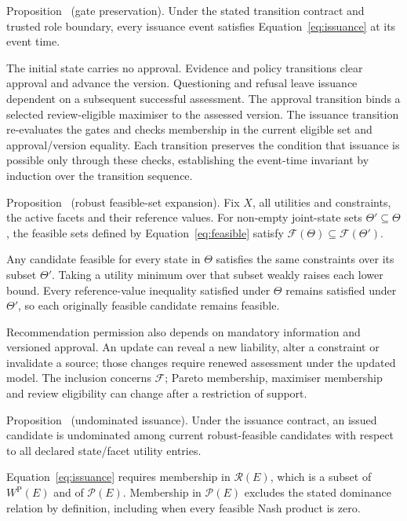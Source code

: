 \documentclass[oneside,10pt,english]{swissi}
\begin{document}
\begin{samepage}
\label{prop:gate}
Proposition~\thetheorem{} (gate preservation). Under the stated transition contract and trusted role boundary, every issuance event satisfies Equation~\eqref{eq:issuance} at its event time.

\nopagebreak[4]
The initial state carries no approval. Evidence and policy transitions clear approval and advance the version. Questioning and refusal leave issuance dependent on a subsequent successful assessment. The approval transition binds a selected review-eligible maximiser to the assessed version. The issuance transition re-evaluates the gates and checks membership in the current eligible set and approval/version equality. Each transition preserves the condition that issuance is possible only through these checks, establishing the event-time invariant by induction over the transition sequence.
\par
\end{samepage}

\begin{samepage}
\label{prop:expansion}
Proposition~\thetheorem{} (robust feasible-set expansion). Fix $X$, all utilities and constraints, the active facets and their reference values. For non-empty joint-state sets $\Theta'\subseteq\Theta$, the feasible sets defined by Equation~\eqref{eq:feasible} satisfy $\mathcal F(\Theta)\subseteq\mathcal F(\Theta')$.

\nopagebreak[4]
Any candidate feasible for every state in $\Theta$ satisfies the same constraints over its subset $\Theta'$. Taking a utility minimum over that subset weakly raises each lower bound. Every reference-value inequality satisfied under $\Theta$ remains satisfied under $\Theta'$, so each originally feasible candidate remains feasible.
\par
\end{samepage}

Recommendation permission also depends on mandatory information and versioned approval. An update can reveal a new liability, alter a constraint or invalidate a source; those changes require renewed assessment under the updated model. The inclusion concerns $\mathcal F$; Pareto membership, maximiser membership and review eligibility can change after a restriction of support.

\begin{samepage}
\label{prop:undominated}
Proposition~\thetheorem{} (undominated issuance). Under the issuance contract, an issued candidate is undominated among current robust-feasible candidates with respect to all declared state/facet utility entries.

\nopagebreak[4]
Equation~\eqref{eq:issuance} requires membership in $\mathcal R(E)$, which is a subset of $W^{\mathrm P}(E)$ and of $\mathcal P(E)$. Membership in $\mathcal P(E)$ excludes the stated dominance relation by definition, including when every feasible Nash product is zero.
\par
\end{samepage}
\end{document}
